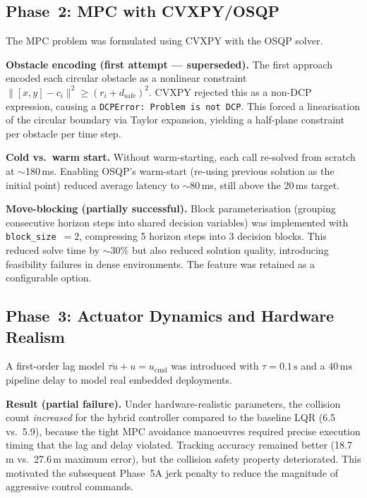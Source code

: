 \documentclass[journal]{IEEEtran}
\begin{document}
\subsection{Phase~2: MPC with CVXPY/OSQP}

The MPC problem was formulated using CVXPY with the OSQP solver.

\textbf{Obstacle encoding (first attempt --- superseded).}
The first approach encoded each circular obstacle as a nonlinear constraint
\(\|[x,y] - c_i\|^2 \geq (r_i + d_{\mathrm{safe}})^2\).
CVXPY rejected this as a non-DCP expression, causing a
\texttt{DCPError: Problem is not DCP}.
This forced a linearisation of the circular boundary via Taylor expansion,
yielding a half-plane constraint per obstacle per time step.

\textbf{Cold vs.\ warm start.}
Without warm-starting, each call re-solved from scratch at $\sim$180\,ms.
Enabling OSQP's warm-start (re-using previous solution as the initial point)
reduced average latency to $\sim$80\,ms, still above the 20\,ms target.

\textbf{Move-blocking (partially successful).}
Block parameterisation (grouping consecutive horizon steps into shared decision
variables) was implemented with \texttt{block\_size}~$= 2$, compressing 5
horizon steps into 3 decision blocks.
This reduced solve time by $\sim$30\% but also reduced solution quality,
introducing feasibility failures in dense environments.
The feature was retained as a configurable option.

\subsection{Phase~3: Actuator Dynamics and Hardware Realism}

A first-order lag model \(\tau\dot{u} + u = u_{\mathrm{cmd}}\) was introduced
with \(\tau = 0.1\,\text{s}\) and a \(40\,\text{ms}\) pipeline delay to model
real embedded deployments.

\textbf{Result (partial failure).}
Under hardware-realistic parameters, the collision count \emph{increased} for
the hybrid controller compared to the baseline LQR (6.5 vs.\ 5.9), because the
tight MPC avoidance manoeuvres required precise execution timing that the lag
and delay violated.
Tracking accuracy remained better (18.7\,m vs.\ 27.6\,m maximum error), but
the collision safety property deteriorated.
This motivated the subsequent Phase~5A jerk penalty to reduce the magnitude of
aggressive control commands.
\end{document}
